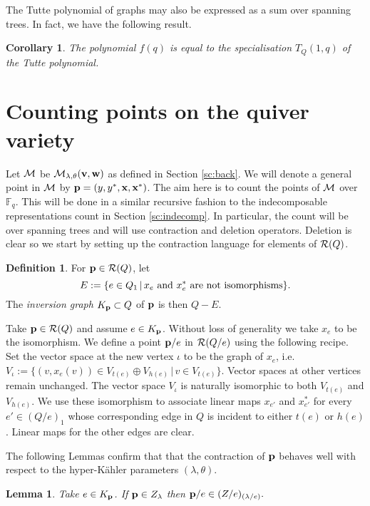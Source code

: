 \documentclass{amsart}
\newtheorem{cor}[thm]{Corollary}
\newtheorem{lem}[thm]{Lemma}
\theoremstyle{definition}
\newtheorem{defn}[thm]{Definition}
\begin{document}
The Tutte polynomial of graphs may also be expressed as a sum over spanning trees.
In fact, we have the following result.

\begin{cor}
The polynomial $f(q)$ is equal to the specialisation $T_Q(1,q)$ of the Tutte polynomial.
\end{cor}


\section{Counting points on the quiver variety}\label{sc:qvariety}

Let $\mathcal{M}$ be $\mathcal{M}_{\lambda, \theta}(\mathbf{v}, \mathbf{w})$ as defined in Section \ref{sc:back}. We will denote a general point in $\mathcal{M}$ by $\mathbf{p} = (y, y^*, \mathbf{x}, \mathbf{x}^*)$. 
The aim here is to count the points of $\mathcal{M}$ over $\mathbb{F}_q$. 
This will be done in a similar recursive fashion to the indecomposable representations count in Section \ref{sc:indecomp}.
In particular, the count will be over spanning trees and will use contraction and deletion operators.
Deletion is clear so we start by setting up the contraction language for elements of $\mathcal{R}(Q)$.

\begin{defn}
For $\mathbf{p} \in \mathcal{R}(Q)$, let $$E:=\{e\in Q_1 \,|\, x_e \textup{ and } x_e^* \textup{ are not isomorphisms}\}.$$   
The {\em inversion graph} $K_{\mathbf{p}} \subset Q$ of $\mathbf{p}$ is then $Q - E$.
\end{defn}

Take $\mathbf{p} \in \mathcal{R}(Q)$ and assume $e\in K_{\mathbf{p}}$.
Without loss of generality we take $x_e$ to be the isomorphism.
We define a point $\mathbf{p}/e$ in $\mathcal{R}(Q/e)$ using the following recipe.
Set the vector space at the new vertex $\iota$ to be the graph of $x_e$, i.e.\ $V_\iota := \{(v, x_e(v)) \in V_{t(e)} \oplus V_{h(e)} \, | \, v \in V_{t(e)}\}$.
Vector spaces at other vertices remain unchanged.
The vector space $V_\iota$ is naturally isomorphic to both $V_{t(e)}$ and $V_{h(e)}$.
We use these isomorphism to associate linear maps $x_{e'}$ and $x_{e'}^*$ for every $e' \in (Q/e)_1$ whose corresponding edge in $Q$ is incident to either $t(e)$ or $h(e)$.
Linear maps for the other edges are clear.

The following Lemmas confirm that that the contraction of $\mathbf{p}$ behaves well with respect to the hyper-K\"ahler parameters $(\lambda, \theta)$.

\begin{lem}\label{lm:contralambda}
Take $e \in K_{\mathbf{p}}$. If $\mathbf{p} \in Z_\lambda$ then $\mathbf{p}/e \in (Z/e)_{(\lambda/e)}.$
\end{lem}
\end{document}

